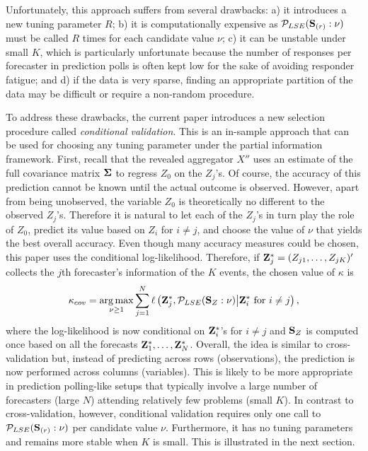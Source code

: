 \documentclass[11pt]{article}
\DeclareMathOperator*{\argmax}{arg\,max}
\theoremstyle{definition}
\theoremstyle{definition}
\def\bSigma{{\bf \Sigma}}
\def\Z{{\bf Z}}
\def\SS{{\bf S}}
\begin{document}
Unfortunately, this approach suffers from several drawbacks: a) it introduces a new tuning parameter $R$; b) it is computationally expensive as $\mathcal{P}_{LSE}(\SS_{(r)} : \nu)$ must be called $R$ times for each candidate value $\nu$; c) it can be unstable under small $K$, which is particularly unfortunate because
 the number of responses per forecaster in prediction polls is often kept low for the sake of avoiding responder fatigue; and d) if the data is very sparse, finding an appropriate partition of the data may be difficult or require a non-random procedure. 



To address these drawbacks, the current paper introduces a new selection procedure called \textit{conditional validation}. This is an in-sample approach that can be used for choosing any tuning parameter under the partial information framework. First, recall that the revealed aggregator $X''$ uses an estimate of the full covariance matrix $\bSigma$ to regress  $Z_0$ on the $Z_{j}$'s. 
 Of course, the accuracy of this prediction cannot be known until the actual outcome is observed. However, apart from being unobserved, the variable $Z_0$ is theoretically no different to the observed $Z_{j}$'s. Therefore it is natural to let each of the $Z_{j}$'s in turn play the role of $Z_0$, predict its value based on $Z_{i}$ for $i \neq j$, and choose the value of $\nu$ that yields the best overall accuracy. Even though many accuracy measures could be chosen, this paper uses the conditional log-likelihood. Therefore, if $\Z_j^* = (Z_{j1}, \dots, Z_{jK})'$ collects the $j$th forecaster's information of the $K$ events, the chosen value of $\kappa$ is
  \begin{align}
\kappa_{cov} = \argmax_{\nu \geq 1} \sum_{j=1}^N \ell \left( \Z_{j}^*, \mathcal{P}_{LSE}(\SS_{Z} : \nu) \big| \Z_i^* \text{ for } i \neq j\right), \label{kappa_cov}
\end{align}
where the log-likelihood is now conditional on $\Z_i^*$'s for $i \neq j$ and $\SS_Z$ is computed once based on all the forecasts $\Z_1^*, \dots, \Z_N^*$. Overall, the idea is similar to cross-validation but, instead of predicting across rows (observations), the prediction is now performed across columns (variables).  This is likely to be more appropriate in prediction polling-like setups that typically involve a large number of forecasters (large $N$) attending relatively few problems (small $K$). In contrast to cross-validation, however, conditional validation requires only one call to $\mathcal{P}_{LSE}(\SS_{(r)} : \nu)$ per candidate value $\nu$. Furthermore, it has no tuning parameters and remains more stable when $K$ is small. This is illustrated in the next section.
\end{document}
